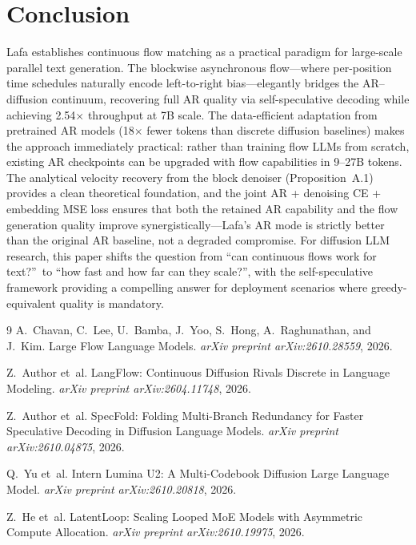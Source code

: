 \documentclass[11pt,a4paper]{article}
\begin{document}
\section{Conclusion}
Lafa establishes continuous flow matching as a practical paradigm for large-scale parallel text generation. The blockwise asynchronous flow---where per-position time schedules naturally encode left-to-right bias---elegantly bridges the AR--diffusion continuum, recovering full AR quality via self-speculative decoding while achieving 2.54$\times$ throughput at 7B scale. The data-efficient adaptation from pretrained AR models (18$\times$ fewer tokens than discrete diffusion baselines) makes the approach immediately practical: rather than training flow LLMs from scratch, existing AR checkpoints can be upgraded with flow capabilities in 9--27B tokens. The analytical velocity recovery from the block denoiser (Proposition~A.1) provides a clean theoretical foundation, and the joint AR + denoising CE + embedding MSE loss ensures that both the retained AR capability and the flow generation quality improve synergistically---Lafa's AR mode is strictly better than the original AR baseline, not a degraded compromise. For diffusion LLM research, this paper shifts the question from ``can continuous flows work for text?''\ to ``how fast and how far can they scale?'', with the self-speculative framework providing a compelling answer for deployment scenarios where greedy-equivalent quality is mandatory.

\begin{thebibliography}{9}
A.~Chavan, C.~Lee, U.~Bamba, J.~Yoo, S.~Hong, A.~Raghunathan, and J.~Kim.
\newblock Large Flow Language Models.
\newblock \emph{arXiv preprint arXiv:2610.28559}, 2026.

Z.~Author et~al.
\newblock LangFlow: Continuous Diffusion Rivals Discrete in Language Modeling.
\newblock \emph{arXiv preprint arXiv:2604.11748}, 2026.

Z.~Author et~al.
\newblock SpecFold: Folding Multi-Branch Redundancy for Faster Speculative Decoding in Diffusion Language Models.
\newblock \emph{arXiv preprint arXiv:2610.04875}, 2026.

Q.~Yu et~al.
\newblock Intern Lumina U2: A Multi-Codebook Diffusion Large Language Model.
\newblock \emph{arXiv preprint arXiv:2610.20818}, 2026.

Z.~He et~al.
\newblock LatentLoop: Scaling Looped MoE Models with Asymmetric Compute Allocation.
\newblock \emph{arXiv preprint arXiv:2610.19975}, 2026.
\end{thebibliography}
\end{document}
